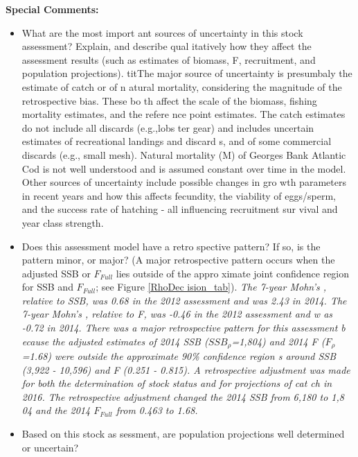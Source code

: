 { \textbf{Special Comments: } \begin{itemize}{} \item{}What are the most import
ant sources of uncertainty in this stock assessment? Explain, and describe qual
itatively how they affect the assessment results (such as estimates of biomass,
 F, recruitment, and population projections). \linebreak{} \hspace*{0.5cm} \tex
tit{The major source of uncertainty is presumbaly the estimate of catch or of n
atural mortality, considering the magnitude of the retrospective bias. These bo
th affect the scale of the biomass, fishing mortality estimates, and the refere
nce point estimates. The catch estimates do not include all discards (e.g.,lobs
ter gear) and includes uncertain estimates of recreational landings and discard
s, and of some commercial discards (e.g., small mesh). Natural mortality (M) of
 Georges Bank Atlantic Cod is not well understood and is assumed constant over 
time in the model. Other sources of uncertainty include possible changes in gro
wth parameters in recent years and how this affects fecundity, the viability of
 eggs/sperm, and the success rate of hatching - all influencing recruitment sur
vival and year class strength.} \item{} Does this assessment model have a retro
spective pattern? If so, is the pattern minor, or major? (A major retrospective
 pattern occurs when the adjusted SSB or $F_{Full}${} lies outside of the appro
ximate joint confidence region for SSB and $F_{Full}${}; see Figure \ref{RhoDec
ision_tab}{}). \linebreak{} \hspace*{0.5cm} \textit{ The 7-year Mohn's \textrho
{}, relative to SSB, was 0.68 in the 2012 assessment and was 2.43 in 2014. The 
7-year Mohn's \textrho{}, relative to F, was -0.46 in the 2012 assessment and w
as -0.72 in 2014. There was a major retrospective pattern for this assessment b
ecause the \textrho{} adjusted estimates of 2014 SSB ($SSB_{\rho}${}=1,804) and
 2014 F ($F_{\rho}${}=1.68) were outside the approximate 90\% confidence region
s around SSB (3,922 - 10,596) and F (0.251 - 0.815). A retrospective adjustment
 was made for both the determination of stock status and for projections of cat
ch in 2016. The retrospective adjustment changed the 2014 SSB from 6,180 to 1,8
04 and the 2014 $F_{Full}${} from 0.463 to 1.68.} \item{}Based on this stock as
sessment, are population projections well determined or uncertain? \linebreak{}

\end{itemize}}
